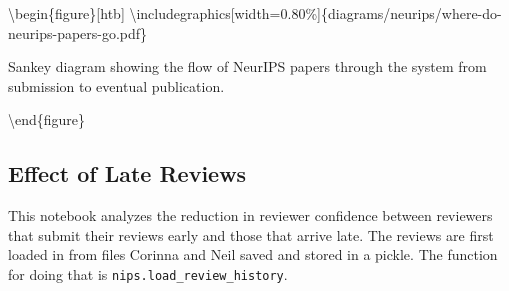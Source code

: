 \textbackslash begin\{figure\}{[}htb{]}
\textbackslash includegraphics{[}width=0.80\%{]}\{diagrams/neurips/where-do-neurips-papers-go.pdf\}

\caption{Sankey diagram showing the flow of NeurIPS papers through the system from submission to eventual publication.}
\label{where-do-neurips-papers-go}

\textbackslash end\{figure\}

\hypertarget{effect-of-late-reviews}{%
\subsection{Effect of Late Reviews}\label{effect-of-late-reviews}}

\begin{flushright}
\end{flushright}

This notebook analyzes the reduction in reviewer confidence between
reviewers that submit their reviews early and those that arrive late.
The reviews are first loaded in from files Corinna and Neil saved and
stored in a pickle. The function for doing that is
\texttt{nips.load\_review\_history}.

\begin{Shaded}
\begin{Highlighting}[]

\end{Highlighting}
\end{Shaded}

